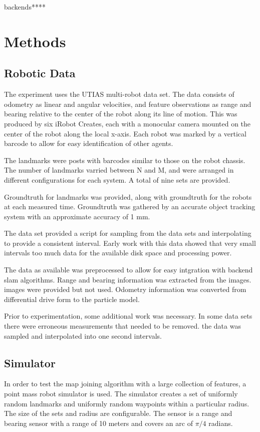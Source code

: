 \documentclass[12pt]{report}
\begin{document}
backends****

\chapter{Methods}
\section{Robotic Data}
The experiment uses the UTIAS multi-robot data set.  The data consists of odometry as linear and angular velocities, and feature observations as range and bearing relative to the center of the robot along its line of motion.  This was produced by six iRobot Creates, each with a monocular camera mounted on the center of the robot along the local x-axis.  Each robot was marked by a vertical barcode to allow for easy identification of other agents.

The landmarks were posts with barcodes similar to those on the robot chassis.  The number of landmarks varried between N and M, and were arranged in different configurations for each system.  A total of nine sets are provided.

Groundtruth for landmarks was provided, along with groundtruth for the robots at each measured time.  Groundtruth was gathered by an accurate object tracking system with an approximate accuracy of 1 mm.

The data set provided a script for sampling from the data sets and interpolating to provide a consistent interval.  Early work with this data showed that very small intervals too much data for the available disk space and processing power.  

The data as available was preprocessed to allow for easy intgration with backend slam algorithms.  Range and bearing information was extracted from the images.   images were provided but not used.  Odometry information was converted from differential drive form to the particle model.

Prior to experimentation, some additional work was necessary.  In some data sets there were erroneous measurements that needed to be removed.  the data was sampled and interpolated into one second intervals.    


\section{Simulator}
In order to test the map joining algorithm with a large collection of features, a point mass robot simulator is used.  The simulator creates a set of uniformly random landmarks and uniformly random waypoints within a particular radius.  The size of the sets and radius are configurable.  The sensor is a range and bearing sensor with a range of 10 meters and covers an arc of $\pi/4$ radians.  
\end{document}
